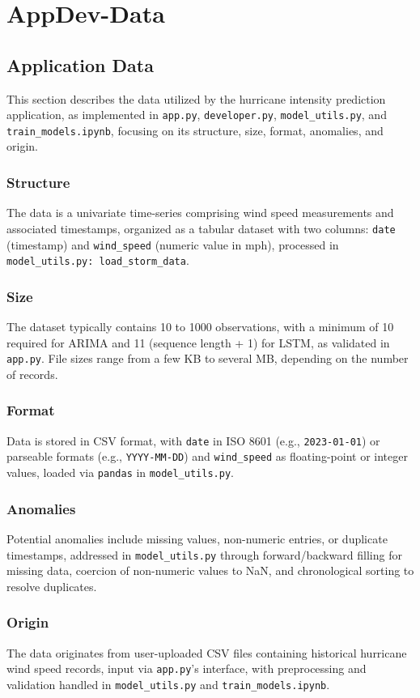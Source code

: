 
%
%

\chapter{AppDev-Data}


\section{Application Data}
This section describes the data utilized by the hurricane intensity prediction application, as implemented in \texttt{app.py}, \texttt{developer.py}, \texttt{model\_utils.py}, and \texttt{train\_models.ipynb}, focusing on its structure, size, format, anomalies, and origin.

\subsection{Structure}
The data is a univariate time-series comprising wind speed measurements and associated timestamps, organized as a tabular dataset with two columns: \texttt{date} (timestamp) and \texttt{wind\_speed} (numeric value in mph), processed in \texttt{model\_utils.py: load\_storm\_data}.

\subsection{Size}
The dataset typically contains 10 to 1000 observations, with a minimum of 10 required for ARIMA and 11 (sequence length + 1) for LSTM, as validated in \texttt{app.py}. File sizes range from a few KB to several MB, depending on the number of records.

\subsection{Format}
Data is stored in CSV format, with \texttt{date} in ISO 8601 (e.g., \texttt{2023-01-01}) or parseable formats (e.g., \texttt{YYYY-MM-DD}) and \texttt{wind\_speed} as floating-point or integer values, loaded via \texttt{pandas} in \texttt{model\_utils.py}.

\subsection{Anomalies}
Potential anomalies include missing values, non-numeric entries, or duplicate timestamps, addressed in \texttt{model\_utils.py} through forward/backward filling for missing data, coercion of non-numeric values to NaN, and chronological sorting to resolve duplicates.

\subsection{Origin}
The data originates from user-uploaded CSV files containing historical hurricane wind speed records, input via \texttt{app.py}'s interface, with preprocessing and validation handled in \texttt{model\_utils.py} and \texttt{train\_models.ipynb}.